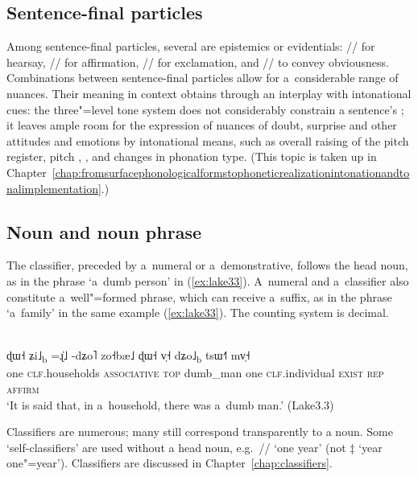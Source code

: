 \subsection{Sentence-final particles}
\label{sec:sentfinparticles}

Among sentence-final particles, several are epistemics or evidentials: // for hearsay, // for affirmation, // for exclamation, and // to convey obviousness. Combinations between sentence-final particles allow for a~considerable range of nuances. Their meaning in context obtains through an interplay with intonational cues: the three"=level tone system does not considerably constrain a sentence’s ; it leaves ample room for the expression of nuances of doubt, surprise and other attitudes and emotions by intonational means, such as overall raising of the pitch register, pitch , , and changes in phonation type. (This topic is taken up in Chapter~\ref{chap:fromsurfacephonologicalformstophoneticrealizationintonationandtonalimplementation}.)


\subsection{Noun and noun phrase}
\label{sec:nounNP}

The classifier, preceded by a~{numeral} or a~{demonstrative}, follows the head noun, as in the phrase ‘a~dumb person’ in (\ref{ex:lake33}). A~numeral and a~classifier also constitute a~well"=formed phrase, which can receive a~{suffix}, as in the phrase ‘a~family’ in the same example (\ref{ex:lake33}). The counting system is decimal. 

\begin{exe}
	\ex
	\label{ex:lake33}
	\\
	\gll ɖɯ˧	ʑi˩\textsubscript{b}					=ɻ̍˩					-dʑo˥			zo˧bæ˩			ɖɯ˧		v̩˧							dʑo˩\textsubscript{b}		 tsɯ˧˥			mv̩˧\\
	one			\textsc{clf}.households		\textsc{associative}	\textsc{top}	dumb\_man	one		\textsc{clf}.individual		\textsc{exist}			\textsc{rep}		\textsc{affirm}\\
	\glt ‘It is said that, in a~household, there was a~dumb man.’ (Lake3.3)
\end{exe}

Classifiers are numerous; many still correspond transparently to a noun. Some ‘self-classifiers’ are used without a head noun, e.g.~// ‘one year’ (not {$\ddagger$}{\kern2pt}  ‘year one"=year’). Classifiers are discussed in Chapter~\ref{chap:classifiers}.

